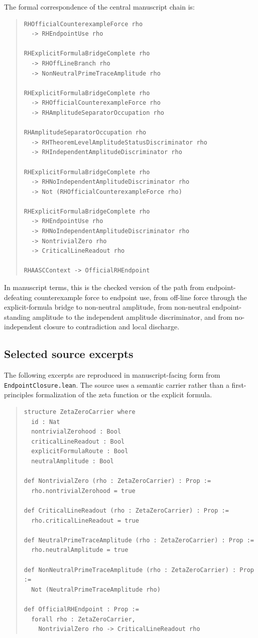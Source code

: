 \documentclass[11pt]{article}
\begin{document}
The formal correspondence of the central manuscript chain is:
\begin{quote}\footnotesize\begin{verbatim}
RHOfficialCounterexampleForce rho
  -> RHEndpointUse rho

RHExplicitFormulaBridgeComplete rho
  -> RHOffLineBranch rho
  -> NonNeutralPrimeTraceAmplitude rho

RHExplicitFormulaBridgeComplete rho
  -> RHOfficialCounterexampleForce rho
  -> RHAmplitudeSeparatorOccupation rho

RHAmplitudeSeparatorOccupation rho
  -> RHTheoremLevelAmplitudeStatusDiscriminator rho
  -> RHIndependentAmplitudeDiscriminator rho

RHExplicitFormulaBridgeComplete rho
  -> RHNoIndependentAmplitudeDiscriminator rho
  -> Not (RHOfficialCounterexampleForce rho)

RHExplicitFormulaBridgeComplete rho
  -> RHEndpointUse rho
  -> RHNoIndependentAmplitudeDiscriminator rho
  -> NontrivialZero rho
  -> CriticalLineReadout rho

RHAASCContext -> OfficialRHEndpoint
\end{verbatim}\end{quote}

In manuscript terms, this is the checked version of the path from endpoint-defeating counterexample force to endpoint use, from off-line force through the explicit-formula bridge to non-neutral amplitude, from non-neutral endpoint-standing amplitude to the independent amplitude discriminator, and from no-independent closure to contradiction and local discharge.

\subsection{Selected source excerpts}

The following excerpts are reproduced in manuscript-facing form from \texttt{EndpointClosure.lean}.  The source uses a semantic carrier rather than a first-principles formalization of the zeta function or the explicit formula.

\begin{quote}\footnotesize\begin{verbatim}
structure ZetaZeroCarrier where
  id : Nat
  nontrivialZerohood : Bool
  criticalLineReadout : Bool
  explicitFormulaRoute : Bool
  neutralAmplitude : Bool

def NontrivialZero (rho : ZetaZeroCarrier) : Prop :=
  rho.nontrivialZerohood = true

def CriticalLineReadout (rho : ZetaZeroCarrier) : Prop :=
  rho.criticalLineReadout = true

def NeutralPrimeTraceAmplitude (rho : ZetaZeroCarrier) : Prop :=
  rho.neutralAmplitude = true

def NonNeutralPrimeTraceAmplitude (rho : ZetaZeroCarrier) : Prop :=
  Not (NeutralPrimeTraceAmplitude rho)

def OfficialRHEndpoint : Prop :=
  forall rho : ZetaZeroCarrier,
    NontrivialZero rho -> CriticalLineReadout rho
\end{verbatim}\end{quote}
\end{document}
